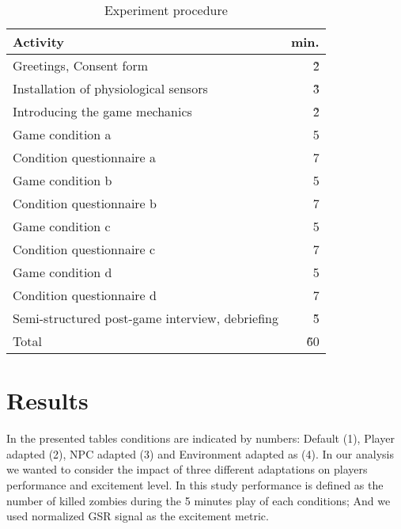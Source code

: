 \documentclass[conference]{IEEEtran}
\begin{document}
\begin{table}[h]
\caption{Experiment procedure}
\label{tbl:experiment-procedure}
\centering
\begin{tabular}{lr}
\hline
Activity                                         & min. \\
\hline
Greetings, Consent form                          & \~2   \\
Installation of physiological sensors            & \~3   \\
Introducing the game mechanics                   & \~2   \\
Game condition a                                 & 5    \\
Condition questionnaire a                        & 7    \\
Game condition b                                 & 5    \\
Condition questionnaire b                        & 7    \\
Game condition c                                 & 5    \\
Condition questionnaire c                        & 7    \\
Game condition d                                 & 5    \\
Condition questionnaire d                        & 7    \\
Semi-structured post-game interview, debriefing  & \~5   \\ 
Total                                            & \~60  \\
\hline
\end{tabular}
\end{table}


\section{Results}
\label{sec:res}


In the presented tables conditions are indicated by numbers: Default (1), Player adapted (2), NPC adapted (3) and Environment adapted as (4). In our analysis we wanted to consider the impact of three different adaptations on players performance and excitement level. In this study performance is defined as the number of killed zombies during the 5 minutes play of each conditions; And we used normalized GSR signal as the excitement metric.
\end{document}
